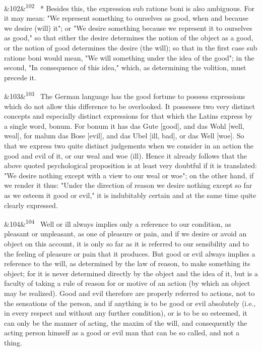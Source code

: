 \documentclass[12pt]{article}
\newcommand{\para}[1][]{\par\noindent\ifx&#1&\else\textsuperscript{\footnotesize #1}~\fi}
\begin{document}
\para[102] * Besides this, the expression sub ratione boni is also ambiguous. For it may mean: "We represent something to ourselves as good, when and because we desire (will) it"; or "We desire something because we represent it to ourselves as good," so that either the desire determines the notion of the object as a good, or the notion of good determines the desire (the will); so that in the first case sub ratione boni would mean, "We will something under the idea of the good"; in the second, "In consequence of this idea," which, as determining the volition, must precede it.

\para[103] The German language has the good fortune to possess expressions which do not allow this difference to be overlooked. It possesses two very distinct concepts and especially distinct expressions for that which the Latins express by a single word, bonum. For bonum it has das Gute [good], and das Wohl [well, weal], for malum das Bose [evil], and das Ubel [ill, bad], or das Well [woe]. So that we express two quite distinct judgements when we consider in an action the good and evil of it, or our weal and woe (ill). Hence it already follows that the above quoted psychological proposition is at least very doubtful if it is translated: "We desire nothing except with a view to our weal or woe"; on the other hand, if we render it thus: "Under the direction of reason we desire nothing except so far as we esteem it good or evil," it is indubitably certain and at the same time quite clearly expressed.

\para[104] Well or ill always implies only a reference to our condition, as pleasant or unpleasant, as one of pleasure or pain, and if we desire or avoid an object on this account, it is only so far as it is referred to our sensibility and to the feeling of pleasure or pain that it produces. But good or evil always implies a reference to the will, as determined by the law of reason, to make something its object; for it is never determined directly by the object and the idea of it, but is a faculty of taking a rule of reason for or motive of an action (by which an object may be realized). Good and evil therefore are properly referred to actions, not to the sensations of the person, and if anything is to be good or evil absolutely (i.e., in every respect and without any further condition), or is to be so esteemed, it can only be the manner of acting, the maxim of the will, and consequently the acting person himself as a good or evil man that can be so called, and not a thing.
\end{document}
